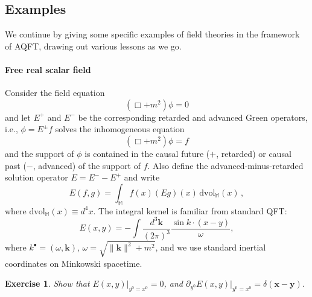 \documentclass[12pt]{article}
\newcommand{\1}{\mathds{1}}                         %
\newcommand{\MM}{\mathbb{M}}
\newcommand{\kb}{{\boldsymbol{k}}}
\newcommand{\xb}{{\boldsymbol{x}}}
\newcommand{\yb}{{\boldsymbol{y}}}
\newcommand{\dvol}{{\textrm{dvol}}}
\newtheorem{exercise}[theorem]{Exercise}
\begin{document}
	\subsection{Examples}\label{sec:examples}
	
	We continue by giving some specific examples of field theories in the framework of AQFT, drawing out various lessons as we go. 
	
	\paragraph{Free real scalar field} Consider the field equation
	\begin{equation}
	(\Box+ m^2)\phi = 0
	\end{equation}
	and let $E^+$ and $E^-$ be the corresponding retarded and advanced Green operators, i.e., 
	$\phi = E^\pm f$ solves the inhomogeneous equation
	\begin{equation}
	(\Box+ m^2)\phi = f
	\end{equation}
	and the support of $\phi$ is contained in the causal future ($+$, retarded) or causal past ($-$, advanced) of the support of $f$. Also define
	the advanced-minus-retarded solution operator $E=E^--E^+$ and write
	\begin{equation}
	E(f,g)= \int_\MM f(x) (Eg)(x)\,\dvol_\MM(x)\,,
	\end{equation}
	where $\dvol_\MM(x)\equiv d^4x$.
	The integral kernel is familiar from standard QFT:
	\begin{equation}
	E(x,y) = -\int \frac{d^3\kb}{(2\pi)^3} \frac{\sin k\cdot (x-y)}{\omega},
	\end{equation}
	where $k^\bullet=(\omega,\kb)$, $\omega=\sqrt{\|\kb\|^2+m^2}$, and we use standard inertial coordinates on Minkowski spacetime.
	\begin{exercise}\label{ex:preETCR}
		Show that $E(x,y)|_{y^0=x^0}=0$, and $\partial_{y^0}E(x,y)|_{y^0=x^0}=\delta(\xb-\yb)$.
	\end{exercise}
	
\end{document}
